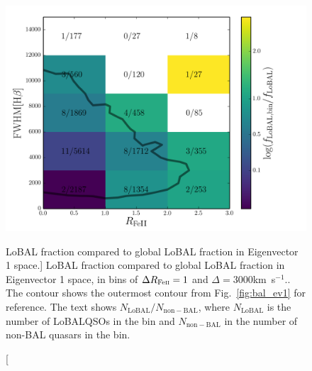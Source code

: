 \begin{figure}
\centering
\includegraphics[width=1.0\textwidth]{figures/ewpaper/ev1_bins.png}
\caption
[LoBAL fraction compared to global LoBAL fraction in Eigenvector 1 space.]
{
LoBAL fraction compared to global LoBAL fraction in Eigenvector 1 space, in bins
of $\Delta R_{{\rm Fe \textsc{ii}}} = 1$ and $\Delta$\fwh$=3000$km~s$^{-1}$..
The contour shows the outermost contour from Fig.~\ref{fig:bal_ev1} for
reference. The text shows $N_{\mathrm{LoBAL}}/N_{\mathrm{non-BAL}}$, 
where $N_{\mathrm{LoBAL}}$ is the number of LoBALQSOs in the bin and 
$N_{\mathrm{non-BAL}}$ in the number of non-BAL quasars in the bin.
}
\label{fig:bal_ev1_bins}
\end{figure}

